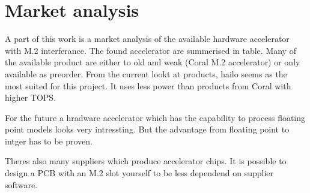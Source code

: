 \chapter{Market analysis}

A part of this work is a market analysis of the available hardware accelerator with M.2 interferance.
The found accelerator are summerised in table.
Many of the available product are either to old and weak (Coral M.2 accelerator) or only available as preorder.
From the current lookt at products, hailo seems as the most suited for this project.
It uses less power than products from Coral with higher TOPS.

For the future a hradware accelerator which has the capability to process floating point models looks very intressting.
But the advantage from floating point to intger has to be proven.


Theres also many suppliers which produce accelerator chips.
It is possible to design a PCB with an M.2 slot yourself to be less dependend on supplier software.


